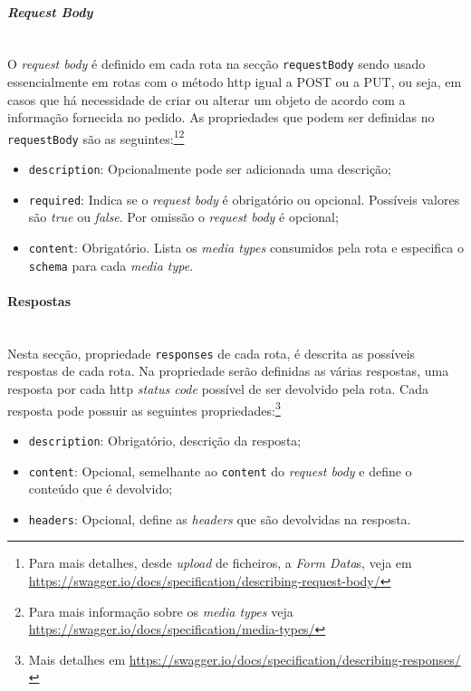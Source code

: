 \paragraph{\textit{Request Body}} \mbox{} \\
O \textit{request body} é definido em cada rota na secção \texttt{requestBody} sendo usado essencialmente em 
rotas com o método \acrshort{http} igual a POST ou a PUT, ou seja, em casos que há necessidade de criar ou alterar 
um objeto de acordo com a informação fornecida no pedido. As propriedades que podem ser definidas no 
\texttt{requestBody} são as seguintes:\footnote{Para mais detalhes, desde \textit{upload} de ficheiros, a \textit{Form Data}s, veja em \url{https://swagger.io/docs/specification/describing-request-body/}}\footnote{Para mais informação sobre os \textit{media types} veja \url{https://swagger.io/docs/specification/media-types/}}
\begin{itemize}
    \item \texttt{description}: Opcionalmente pode ser adicionada uma descrição;
    \item \texttt{required}: Indica se o \textit{request body} é obrigatório ou opcional. 
    Possíveis valores são \textit{true} ou \textit{false}. Por omissão o \textit{request body} é opcional;
    \item \texttt{content}: Obrigatório. Lista os \textit{media types} consumidos pela rota e especifica 
    o \texttt{schema} para cada \textit{media type}.
\end{itemize}

\paragraph{Respostas} \mbox{} \\
Nesta secção, propriedade \texttt{responses} de cada rota, é descrita as possíveis respostas de cada rota. 
Na propriedade serão definidas as várias respostas, uma resposta por cada \acrshort{http} \textit{status code} 
possível de ser devolvido pela rota. Cada resposta pode possuir as seguintes propriedades:\footnote{Mais detalhes em \url{https://swagger.io/docs/specification/describing-responses/}}
\begin{itemize}
    \item \texttt{description}: Obrigatório, descrição da resposta;
    \item \texttt{content}: Opcional, semelhante ao \texttt{content} do \textit{request body} e define o 
    conteúdo que é devolvido;
    \item \texttt{headers}: Opcional, define as \textit{headers} que são devolvidas na resposta.
\end{itemize}

